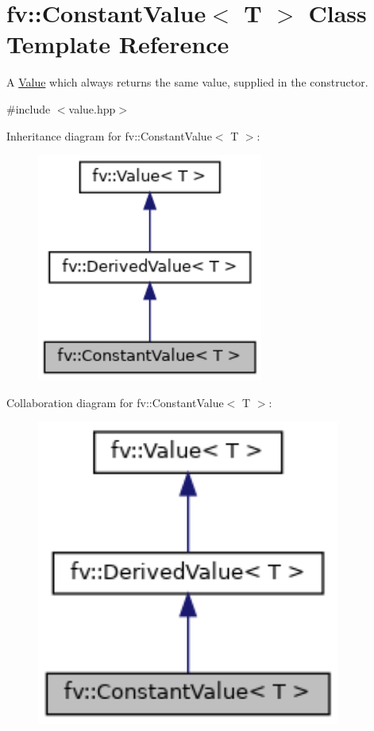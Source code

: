 \hypertarget{classfv_1_1ConstantValue}{}\section{fv\+:\+:Constant\+Value$<$ T $>$ Class Template Reference}
\label{classfv_1_1ConstantValue}


A \hyperlink{classfv_1_1Value}{Value} which always returns the same value, supplied in the constructor.  




{\ttfamily \#include $<$value.\+hpp$>$}



Inheritance diagram for fv\+:\+:Constant\+Value$<$ T $>$\+:
\nopagebreak
\begin{figure}[H]
\begin{center}
\leavevmode
\includegraphics[width=211pt]{classfv_1_1ConstantValue__inherit__graph}
\end{center}
\end{figure}


Collaboration diagram for fv\+:\+:Constant\+Value$<$ T $>$\+:
\nopagebreak
\begin{figure}[H]
\begin{center}
\leavevmode
\includegraphics[width=283pt]{classfv_1_1ConstantValue__coll__graph}
\end{center}
\end{figure}

